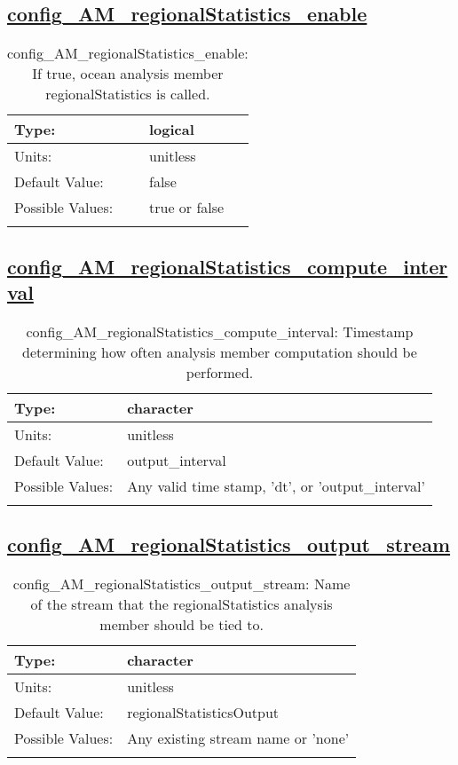 \subsection[config\_AM\_regionalStatistics\_enable]{\hyperref[sec:nm_tab_AM_regionalStatistics]{config\_AM\_regionalStatistics\_enable}}
\label{subsec:nm_sec_config_AM_regionalStatistics_enable}
\begin{center}
\begin{longtable}{| p{2.0in} || p{4.0in} |}
    \hline
    Type: & logical \\
    \hline
    Units: & \si{unitless} \\
    \hline
    Default Value: & false \\
    \hline
    Possible Values: & true or false \\
    \hline
    \caption{config\_AM\_regionalStatistics\_enable: If true, ocean analysis member regionalStatistics is called.}
\end{longtable}
\end{center}
\subsection[config\_AM\_regionalStatistics\_compute\_interval]{\hyperref[sec:nm_tab_AM_regionalStatistics]{config\_AM\_regionalStatistics\_compute\_interval}}
\label{subsec:nm_sec_config_AM_regionalStatistics_compute_interval}
\begin{center}
\begin{longtable}{| p{2.0in} || p{4.0in} |}
    \hline
    Type: & character \\
    \hline
    Units: & \si{unitless} \\
    \hline
    Default Value: & output\_interval \\
    \hline
    Possible Values: & Any valid time stamp, 'dt', or 'output\_interval' \\
    \hline
    \caption{config\_AM\_regionalStatistics\_compute\_interval: Timestamp determining how often analysis member computation should be performed.}
\end{longtable}
\end{center}
\subsection[config\_AM\_regionalStatistics\_output\_stream]{\hyperref[sec:nm_tab_AM_regionalStatistics]{config\_AM\_regionalStatistics\_output\_stream}}
\label{subsec:nm_sec_config_AM_regionalStatistics_output_stream}
\begin{center}
\begin{longtable}{| p{2.0in} || p{4.0in} |}
    \hline
    Type: & character \\
    \hline
    Units: & \si{unitless} \\
    \hline
    Default Value: & regionalStatisticsOutput \\
    \hline
    Possible Values: & Any existing stream name or 'none' \\
    \hline
    \caption{config\_AM\_regionalStatistics\_output\_stream: Name of the stream that the regionalStatistics analysis member should be tied to.}
\end{longtable}
\end{center}
